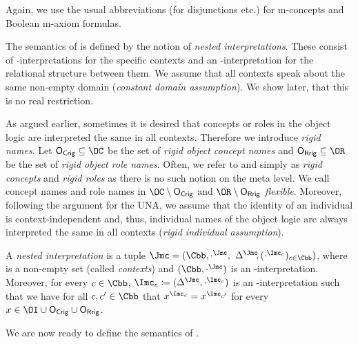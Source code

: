 Again, we use the usual abbreviations (for disjunctions etc.) for m-concepts and
Boolean m-axiom formulas.

The semantics of \LMLO is defined by the notion of \emph{nested interpretations}.  These consist of
\Osig-interpretations for the specific contexts and an \Msig-interpretation for the relational
structure between them.  We assume that all contexts speak about the same non-empty domain
(\emph{constant domain assumption}). We show later, that this is no real restriction.

As argued earlier, sometimes it is desired that concepts or roles in the object logic are
interpreted the same in all contexts. Therefore we introduce \emph{rigid names}. Let
$\OCR\subseteq\OC$ be the set of \emph{rigid object concept names} and $\ORR\subseteq\OR$ be the set
of \emph{rigid object role names}.  Often, we refer to \OCR and \ORR simply as \emph{rigid concepts}
and \emph{rigid roles} as there is no such notion on the meta level.  We call concept names and role
names in $\OC\setminus\OCR$ and $\OR\setminus\ORR$ \emph{flexible}.  Moreover, following the
argument for the UNA, we assume that the identity of an individual is context-independent and, thus,
individual names of the object logic are always interpreted the same in all contexts (\emph{rigid
  individual assumption}).

\begin{definition}\label{def:nested-interpretation}
  A \emph{nested interpretation} is a tuple
  $\J=(\Cbb,\cdot^{\J},$ $\Delta^{\J}{\kern-0.2em},(\cdot^{\I_c})_{c\in\Cbb})$, where \Cbb is a
  non-empty set (called \emph{contexts}) and $(\Cbb,\cdot^\J)$ is an \Msig-interpretation.
  Moreover, for every $c\in\Cbb$, $\I_c\coloneqq(\Delta^{\J},\cdot^{\I_c})$ is an
  \Osig-interpretation such that we have for all $c,c'\in\Cbb$ that $x^{\I_{c}}=x^{\I_{c'}}$ for
  every $x\in\OI\cup\OCR\cup\ORR$.
\end{definition}

We are now ready to define the semantics of \LMLO.

